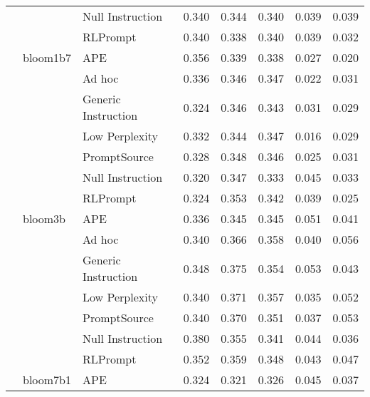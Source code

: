 \begin{supertabular}{lllrrrrr}
              &        & Null Instruction &            0.340 &           0.344 &          0.340 &        0.039 &    0.039 \\
              &        & RLPrompt &            0.340 &           0.338 &          0.340 &        0.039 &    0.032 \\
              & bloom1b7 & APE &            0.356 &           0.339 &          0.338 &        0.027 &    0.020 \\
              &        & Ad hoc &            0.336 &           0.346 &          0.347 &        0.022 &    0.031 \\
              &        & Generic Instruction &            0.324 &           0.346 &          0.343 &        0.031 &    0.029 \\
              &        & Low Perplexity &            0.332 &           0.344 &          0.347 &        0.016 &    0.029 \\
              &        & PromptSource &            0.328 &           0.348 &          0.346 &        0.025 &    0.031 \\
              &        & Null Instruction &            0.320 &           0.347 &          0.333 &        0.045 &    0.033 \\
              &        & RLPrompt &            0.324 &           0.353 &          0.342 &        0.039 &    0.025 \\
              & bloom3b & APE &            0.336 &           0.345 &          0.345 &        0.051 &    0.041 \\
              &        & Ad hoc &            0.340 &           0.366 &          0.358 &        0.040 &    0.056 \\
              &        & Generic Instruction &            0.348 &           0.375 &          0.354 &        0.053 &    0.043 \\
              &        & Low Perplexity &            0.340 &           0.371 &          0.357 &        0.035 &    0.052 \\
              &        & PromptSource &            0.340 &           0.370 &          0.351 &        0.037 &    0.053 \\
              &        & Null Instruction &            0.380 &           0.355 &          0.341 &        0.044 &    0.036 \\
              &        & RLPrompt &            0.352 &           0.359 &          0.348 &        0.043 &    0.047 \\
              & bloom7b1 & APE &            0.324 &           0.321 &          0.326 &        0.045 &    0.037 \\

\end{supertabular}
